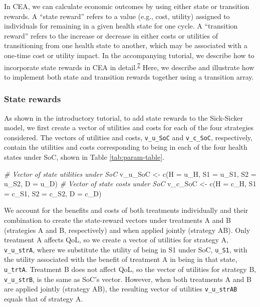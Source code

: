 \documentclass[
]{article}
\newenvironment{Shaded}{\begin{snugshade}}{\end{snugshade}}
\newcommand{\AttributeTok}[1]{\textcolor[rgb]{0.77,0.63,0.00}{#1}}
\newcommand{\CommentTok}[1]{\textcolor[rgb]{0.56,0.35,0.01}{\textit{#1}}}
\newcommand{\FunctionTok}[1]{\textcolor[rgb]{0.00,0.00,0.00}{#1}}
\newcommand{\NormalTok}[1]{#1}
\newcommand{\OtherTok}[1]{\textcolor[rgb]{0.56,0.35,0.01}{#1}}
\begin{document}
In CEA, we can calculate economic outcomes by using either state or transition rewards. A ``state reward'' refers to a value (e.g., cost, utility) assigned to individuals for remaining in a given health state for one cycle. A ``transition reward'' refers to the increase or decrease in either costs or utilities of transitioning from one health state to another, which may be associated with a one-time cost or utility impact. In the accompanying tutorial, we describe how to incorporate state rewards in CEA in detail.\textsuperscript{\protect\hyperlink{ref-Alarid-Escudero2021a}{7}} Here, we describe and illustrate how to implement both state and transition rewards together using a transition array.

\hypertarget{state-rewards}{%
\subsubsection{State rewards}\label{state-rewards}}

As shown in the introductory tutorial, to add state rewards to the Sick-Sicker model, we first create a vector of utilities and costs for each of the four strategies considered. The vectors of utilities and costs, \texttt{v\_u\_SoC} and \texttt{v\_c\_SoC}, respectively, contain the utilities and costs corresponding to being in each of the four health states under SoC, shown in Table \ref{tab:param-table}.

\begin{Shaded}
\begin{Highlighting}[]
\CommentTok{\# Vector of state utilities under SoC}
\NormalTok{v\_u\_SoC }\OtherTok{\textless{}{-}} \FunctionTok{c}\NormalTok{(}\AttributeTok{H =}\NormalTok{ u\_H, }\AttributeTok{S1 =}\NormalTok{ u\_S1, }\AttributeTok{S2 =}\NormalTok{ u\_S2, }\AttributeTok{D =}\NormalTok{ u\_D)}
\CommentTok{\# Vector of state costs under SoC}
\NormalTok{v\_c\_SoC }\OtherTok{\textless{}{-}} \FunctionTok{c}\NormalTok{(}\AttributeTok{H =}\NormalTok{ c\_H, }\AttributeTok{S1 =}\NormalTok{ c\_S1, }\AttributeTok{S2 =}\NormalTok{ c\_S2, }\AttributeTok{D =}\NormalTok{ c\_D)}
\end{Highlighting}
\end{Shaded}

We account for the benefits and costs of both treatments individually and their combination to create the state-reward vectors under treatments A and B (strategies A and B, respectively) and when applied jointly (strategy AB). Only treatment A affects QoL, so we create a vector of utilities for strategy A, \texttt{v\_u\_strA}, where we substitute the utility of being in S1 under SoC, \texttt{u\_S1}, with the utility associated with the benefit of treatment A in being in that state, \texttt{u\_trtA}. Treatment B does not affect QoL, so the vector of utilities for strategy B, \texttt{v\_u\_strB}, is the same as SoC's vector. However, when both treatments A and B are applied jointly (strategy AB), the resulting vector of utilities \texttt{v\_u\_strAB} equals that of strategy A.
\end{document}
